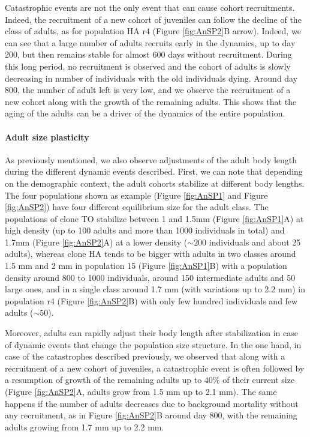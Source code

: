 Catastrophic events are not the only event that can cause cohort recruitments.
Indeed, the recruitment of a new cohort of juveniles can follow the decline of
the class of adults, as for population HA r4 (Figure \ref{fig:AnSP2}B arrow). Indeed, we can
see that a large number of adults recruits early in the dynamics, up to day 200,
but then remains stable for almost 600 days without recruitment. During this
long period, no recruitment is observed and the cohort of adults is slowly
decreasing in number of individuals with the old individuals dying. Around day
800, the number of adult left is very low, and we observe the recruitment of a
new cohort along with the growth of the remaining adults. This shows that the
aging of the adults can be a driver of the dynamics of the entire population.

\paragraph{Adult size plasticity}

As previously mentioned, we also observe adjustments of the adult body length
during the different dynamic events described. First, we can note that depending
on the demographic context, the adult cohorts stabilize at different body
lengths. The four populations shown as example (Figure \ref{fig:AnSP1} and
Figure \ref{fig:AnSP2}) have four different equilibrium size for the adult
class. The populations of clone TO stabilize between 1 and 1.5mm (Figure
\ref{fig:AnSP1}A) at high density (up to 100 adults and more than 1000
individuals in total) and 1.7mm (Figure \ref{fig:AnSP2}A) at a lower density
($\sim 200$ individuals and about 25 adults), whereas clone HA tends to be
bigger with adults in two classes around 1.5 mm and 2 mm in population 15
(Figure \ref{fig:AnSP1}B) with a population density around 800 to 1000
individuals, around 150 intermediate adults and 50 large ones, and in a single class around 1.7 mm (with
variations up to 2.2 mm) in population r4 (Figure \ref{fig:AnSP2}B) with only few hundred
individuals and few adults ($\sim 50$).

Moreover, adults can rapidly adjust their body length after stabilization in
case of dynamic events that change the population size structure. In the one
hand, in case of the catastrophes described previously, we observed that along
with a recruitment of a new cohort of juveniles, a catastrophic event is often
followed by a resumption of growth of the remaining adults up to $40\%$ of their
current size (Figure \ref{fig:AnSP2}A, adults grow from 1.5 mm up to 2.1 mm).
The same happens if the number of adults decreases due to background mortality
without any recruitment, as in Figure \ref{fig:AnSP2}B around day 800, with the
remaining adults growing from 1.7 mm up to 2.2 mm.

